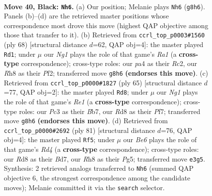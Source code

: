 \documentclass[11pt]{article}
\begin{document}
\clearpage

\begin{figure}[p]\centering
\begin{subfigure}{0.46\textwidth}\centering
\resizebox{\linewidth}{!}{%
\newchessgame
\chessboard[
  setfen={3r2nr/p6p/5k2/8/P5B1/1Pp1b1BP/R1P3PK/1R6 b - - 2 40},
  showmover=false,
  pgfstyle=straightmove, color=movearrow, markmove={g8-h6}
]}
\caption{}
\end{subfigure}\hfill
\begin{subfigure}{0.46\textwidth}\centering
\resizebox{\linewidth}{!}{%
\newchessgame
\chessboard[
  setfen={3rk3/p3pp1p/1p1b2p1/8/P7/7P/2R2PP1/R6K w - - 0 35},
  showmover=false,
  pgfstyle=straightmove, color=movearrow, markmove={a1-d1}
]}
\caption{}
\end{subfigure}
\\[4pt]
\begin{subfigure}{0.46\textwidth}\centering
\resizebox{\linewidth}{!}{%
\newchessgame
\chessboard[
  setfen={4r1k1/1b3pp1/p6p/3np3/P1R5/7P/1PB2PP1/4B1K1 b - - 1 33},
  showmover=false,
  pgfstyle=straightmove, color=movearrow, markmove={e8-d8}
]}
\caption{}
\end{subfigure}\hfill
\begin{subfigure}{0.46\textwidth}\centering
\resizebox{\linewidth}{!}{%
\newchessgame
\chessboard[
  setfen={8/1p1b4/p5k1/3r2pp/1B6/P4P2/1P2RKPP/8 b - - 4 41},
  showmover=false,
  pgfstyle=straightmove, color=movearrow, markmove={d5-f5}
]}
\caption{}
\end{subfigure}
\caption{\textbf{Move 40, Black: \texttt{Nh6}.} (a) Our position; Melanie plays \texttt{Nh6} (\texttt{g8h6}). Panels (b)--(d) are the retrieved master positions whose correspondence most drove this move (highest QAP objective among those that transfer to it). (b) Retrieved from \texttt{ccrl\_top\_p0003\#1560} (ply 68) [structural distance $d$=62, QAP obj=4]: the master played \texttt{Rd1}; under $\mu$ our \emph{Ng1} plays the role of that game's \emph{Ra1} (a \textbf{cross-type} correspondence); cross-type roles: our \emph{p}a4 as their \emph{R}c2, our \emph{R}h8 as their \emph{P}f2; transferred move \texttt{g8h6} \textbf{(endorses this move)}. (c) Retrieved from \texttt{ccrl\_top\_p0000\#1827} (ply 65) [structural distance $d$=77, QAP obj=2]: the master played \texttt{Rd8}; under $\mu$ our \emph{Ng1} plays the role of that game's \emph{Re1} (a \textbf{cross-type} correspondence); cross-type roles: our \emph{P}c3 as their \emph{B}b7, our \emph{R}d8 as their \emph{P}f7; transferred move \texttt{g8h6} \textbf{(endorses this move)}. (d) Retrieved from \texttt{ccrl\_top\_p0000\#2692} (ply 81) [structural distance $d$=76, QAP obj=4]: the master played \texttt{Rf5}; under $\mu$ our \emph{Be6} plays the role of that game's \emph{Rd4} (a \textbf{cross-type} correspondence); cross-type roles: our \emph{R}d8 as their \emph{B}d7, our \emph{R}h8 as their \emph{P}g5; transferred move \texttt{e3g5}. Synthesis: 2 retrieved analogs transferred to \texttt{Nh6} (summed QAP objective 6, the strongest correspondence among the candidate moves); Melanie committed it via the \texttt{search} selector.}
\label{fig:thought-m79}
\end{figure}
\end{document}
